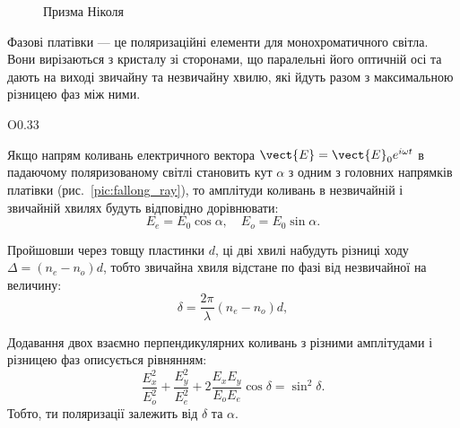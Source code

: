 \begin{figure}[h!]\centering

\caption{Призма Ніколя}
\label{pic:Nicol}
\end{figure}


Фазові платівки --- це поляризаційні елементи для
монохроматичного світла. Вони вирізаються з кристалу зі сторонами, що
паралельні його оптичній осі та дають на виході звичайну та незвичайну
хвилю, які йдуть разом з максимальною різницею фаз між ними.

\begin{wrapfigure}{O}{0.33\linewidth}\centering
\caption{}
\label{pic:fallong_ray}
\end{wrapfigure}
Якщо напрям коливань електричного вектора $ \vect{E} = \vect{E}_0 e^{i\omega t}  $ в падаючому поляризованому світлі становить кут $\alpha$ з одним з головних напрямків платівки (рис.~\ref{pic:fallong_ray}), то амплітуди коливань в незвичайній і звичайній хвилях будуть відповідно дорівнювати:
\begin{equation*}
    E_e = E_0 \cos\alpha,\quad E_o = E_0\sin\alpha.
\end{equation*}


Пройшовши через товщу пластинки $ d $, ці дві хвилі набудуть різниці ходу  $ \Delta = (n_e - n_o) d$, тобто звичайна хвиля відстане по фазі від незвичайної на величину:
\begin{equation}\label{eq:phase_delta}
    \delta = \frac{2\pi}{\lambda} (n_e - n_o) d,
\end{equation}

Додавання двох взаємно перпендикулярних коливань з різними амплітудами і різницею фаз описується рівнянням:
\begin{equation}\label{eq:ellipse_eqn}
    \frac{E_x^2}{E_o^2} + \frac{E_y^2}{E_e^2} + 2\frac{E_xE_y}{E_oE_e}\cos\delta = \sin^2\delta.
\end{equation}
Тобто, ти поляризації залежить від $\delta$ та $ \alpha $.

